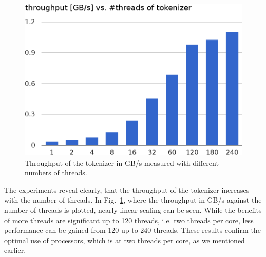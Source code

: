 \begin{figure}\centering
  \includegraphics[scale=.75]{img/tokenizer_throughput_2.eps}
  \caption{Throughput of the tokenizer in GB/s measured with different numbers of threads.
  \label{tokenizer_throughput}}
\end{figure}
The experiments reveal clearly, that the throughput of the tokenizer increases with the number of threads. In Fig.~\ref{tokenizer_throughput}, where the throughput in GB/s against the number of threads is plotted, nearly linear scaling can be seen. While the benefits of more threads are significant up to 120 threads, i.e. two threads per core, less performance can be gained from 120 up to 240 threads. These results confirm the optimal use of processors, which is at two threads per core, as we mentioned earlier.

